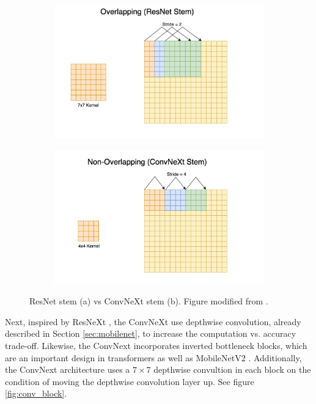 \begin{figure}[h!]
    \centering
    \begin{subfigure}[b]{0.45\textwidth}
        \centering
        \includegraphics[width=\textwidth]{Images/cnnstem.png}
        \caption{}
        \label{fig:sub1}
    \end{subfigure}
    \hspace*{0.0\textwidth}    %
    \begin{subfigure}[b]{0.45\textwidth}
        \centering
        \includegraphics[width=\textwidth]{Images/convnextstem.png}
        \caption{}
        \label{fig:sub2}
    \end{subfigure}
    \caption{ResNet stem (a) vs ConvNeXt stem (b). Figure modified from \cite{convnext_guide}.}
    \label{fig:stem}
\end{figure}

\noindent Next, inspired by ResNeXt \cite{xie2017aggregatedresidualtransformationsdeep}, the ConvNeXt use depthwise convolution, already described in Section \ref{sec:mobilenet}, to increase the computation vs. accuracy trade-off. Likewise, the ConvNext incorporates inverted bottleneck blocks, which are an important design in transformers as well as MobileNetV2 \cite{liu2022convnet2020s}. Additionally, the ConvNext architecture uses a $7 \times 7$ depthwise convultion in each block on the condition of moving the depthwise convolution layer up. See figure \ref{fig:conv_block}.

